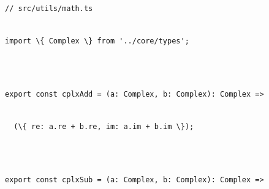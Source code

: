 \documentclass[
]{article}
\newcommand{\passthrough}[1]{#1}
\begin{document}
\passthrough{\lstinline!//!}\passthrough{\lstinline! !}\passthrough{\lstinline!src!}\passthrough{\lstinline!/!}\passthrough{\lstinline!utils!}\passthrough{\lstinline!/!}\passthrough{\lstinline!math!}\passthrough{\lstinline!.!}\passthrough{\lstinline!ts!}\strut \\
\passthrough{\lstinline!import!}\passthrough{\lstinline! !}\passthrough{\lstinline!\{!}\passthrough{\lstinline! !}\passthrough{\lstinline!Complex!}\passthrough{\lstinline! !}\passthrough{\lstinline!\}!}\passthrough{\lstinline! !}\passthrough{\lstinline!from!}\passthrough{\lstinline! !}\passthrough{\lstinline!'../!}\passthrough{\lstinline!core!}\passthrough{\lstinline!/!}\passthrough{\lstinline!types!}\passthrough{\lstinline!';!}\strut \\
\strut \\
\passthrough{\lstinline!export!}\passthrough{\lstinline! !}\passthrough{\lstinline!const!}\passthrough{\lstinline! !}\passthrough{\lstinline!cplxAdd!}\passthrough{\lstinline! !}\passthrough{\lstinline!=!}\passthrough{\lstinline! !}\passthrough{\lstinline!(!}\passthrough{\lstinline!a!}\passthrough{\lstinline!:!}\passthrough{\lstinline! !}\passthrough{\lstinline!Complex!}\passthrough{\lstinline!,!}\passthrough{\lstinline! !}\passthrough{\lstinline!b!}\passthrough{\lstinline!:!}\passthrough{\lstinline! !}\passthrough{\lstinline!Complex!}\passthrough{\lstinline!):!}\passthrough{\lstinline! !}\passthrough{\lstinline!Complex!}\passthrough{\lstinline! !}\passthrough{\lstinline!=>!}\strut \\
\passthrough{\lstinline!  !}\passthrough{\lstinline!(\{!}\passthrough{\lstinline! !}\passthrough{\lstinline!re!}\passthrough{\lstinline!:!}\passthrough{\lstinline! !}\passthrough{\lstinline!a!}\passthrough{\lstinline!.!}\passthrough{\lstinline!re!}\passthrough{\lstinline! !}\passthrough{\lstinline!+!}\passthrough{\lstinline! !}\passthrough{\lstinline!b!}\passthrough{\lstinline!.!}\passthrough{\lstinline!re!}\passthrough{\lstinline!,!}\passthrough{\lstinline! !}\passthrough{\lstinline!im!}\passthrough{\lstinline!:!}\passthrough{\lstinline! !}\passthrough{\lstinline!a!}\passthrough{\lstinline!.!}\passthrough{\lstinline!im!}\passthrough{\lstinline! !}\passthrough{\lstinline!+!}\passthrough{\lstinline! !}\passthrough{\lstinline!b!}\passthrough{\lstinline!.!}\passthrough{\lstinline!im!}\passthrough{\lstinline! !}\passthrough{\lstinline!\});!}\strut \\
\strut \\
\passthrough{\lstinline!export!}\passthrough{\lstinline! !}\passthrough{\lstinline!const!}\passthrough{\lstinline! !}\passthrough{\lstinline!cplxSub!}\passthrough{\lstinline! !}\passthrough{\lstinline!=!}\passthrough{\lstinline! !}\passthrough{\lstinline!(!}\passthrough{\lstinline!a!}\passthrough{\lstinline!:!}\passthrough{\lstinline! !}\passthrough{\lstinline!Complex!}\passthrough{\lstinline!,!}\passthrough{\lstinline! !}\passthrough{\lstinline!b!}\passthrough{\lstinline!:!}\passthrough{\lstinline! !}\passthrough{\lstinline!Complex!}\passthrough{\lstinline!):!}\passthrough{\lstinline! !}\passthrough{\lstinline!Complex!}\passthrough{\lstinline! !}\passthrough{\lstinline!=>!}\strut \\
\end{document}

